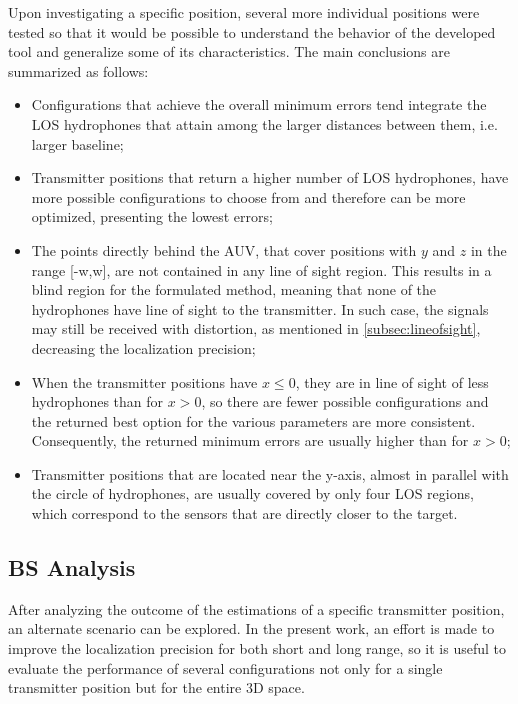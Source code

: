 Upon investigating a specific position, several more individual positions were tested so that it would be possible to understand the behavior of the developed tool and generalize some of its characteristics. The main conclusions are summarized as follows:
\begin{itemize}
	\item Configurations that achieve the overall minimum errors tend integrate the LOS hydrophones that attain among the larger distances between them, i.e. larger baseline;
	
	\item Transmitter positions that return a higher number of LOS hydrophones, have more possible configurations to choose from and therefore can be more optimized, presenting the lowest errors;
	
	\item The points directly behind the AUV, that cover positions with $y$ and $z$ in the range [-w,w], are not contained in any line of sight region. This results in a blind region for the formulated method, meaning that none of the hydrophones have line of sight to the transmitter. In such case, the signals may still be received with distortion, as mentioned in \ref{subsec:lineofsight}, decreasing the localization precision;
	
	\item When the transmitter positions have $x \leq 0$, they are in line of sight of less hydrophones than for $x > 0$, so there are fewer possible configurations and the returned best option for the various parameters are more consistent. Consequently, the returned minimum errors are usually higher than for $x > 0$;
	
	\item Transmitter positions that are located near the y-axis, almost in parallel with the circle of hydrophones, are usually covered by only four LOS regions, which correspond to the sensors that are directly closer to the target.
\end{itemize}

\subsection{BS Analysis} \label{subsec:bs-2}

After analyzing the outcome of the estimations of a specific transmitter position, an alternate scenario can be explored. In the present work, an effort is made to improve the localization precision for both short and long range, so it is useful to evaluate the performance of several configurations  not only for a single transmitter position but for the entire 3D space. 

